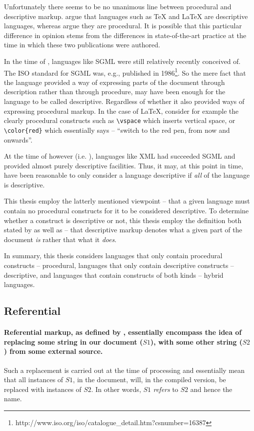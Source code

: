 \documentclass{scrreprt}
\begin{document}
Unfortunately there seems to be no unanimous line between procedural and descriptive markup. \citet{coombs} argue that languages such as \TeX{} and \LaTeX{} are descriptive languages, whereas \citet{bray} argue they are procedural. It is possible that this particular difference in opinion stems from the differences in state-of-the-art practice at the time in which these two publications were authored.

In the time of \citet{coombs}, languages like SGML were still relatively recently conceived of. The ISO standard for SGML was, e.g., published in 1986\footnote{ http://www.iso.org/iso/catalogue\_detail.htm?csnumber=16387}. So the mere fact that the language provided a way of expressing parts of the document through description rather than through procedure, may have been enough for the language to be called descriptive. Regardless of whether it also provided ways of expressing procedural markup. In the case of \LaTeX{}, consider for example the clearly procedural constructs such as \texttt{\textbackslash vspace} which inserts vertical space, or  \texttt{\textbackslash color\{red\}} which essentially says -- ``switch to the red pen, from now and onwards''.

At the time of \citet{bray} however (i.e. \citeyear{bray}), languages like XML had succeeded SGML and provided almost purely descriptive facilities. Thus, it may, at this point in time, have been reasonable to only consider a language descriptive if \emph{all} of the language is descriptive.

This thesis employ the latterly mentioned viewpoint -- that a given language must contain no procedural constructs for it to be considered descriptive. To determine whether a construct is descriptive or not, this thesis employ the definition both stated by \citet{coombs} as well as \citet{bray} -- that descriptive markup denotes what a given part of the document \emph{is} rather that what it \emph{does}.

In summary, this thesis considers languages that only contain procedural constructs -- procedural, languages that only contain descriptive constructs -- descriptive, and languages that contain constructs of both kinds -- hybrid languages.  


\subsection{Referential}
\label{sec:referential-markup}
\paragraph{Referential markup, as defined by \citet{coombs}, essentially encompass the idea of replacing some string in our document ($S1$), with some other string ($S2$) from some external source.} Such a replacement is carried out at the time of processing and essentially mean that all instances of $S1$, in the document, will, in the compiled version, be replaced with instances of $S2$. In other words, $S1$ \emph{refers} to $S2$ and hence the name.
\end{document}
